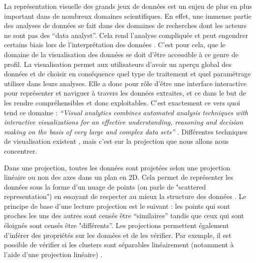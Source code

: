 
La représentation visuelle des grands jeux de données est un enjeu de plus en plus important dans de nombreux domaines scientifiques. En effet, une immense partie des analyses de données se fait dans des domaines de recherches dont les acteurs ne sont pas des “data analyst”. Cela rend l’analyse compliquée et peut engendrer certains biais lors de l’interprétation des données \cite{HeulotAnEvaluation}. C’est pour cela, que le domaine de la visualisation des données se doit d’être accessible à ce genre de profil.\newline
La visualisation permet aux utilisateurs d’avoir un aperçu global des données et de choisir en conséquence quel type de traitement et quel paramétrage utiliser dans leurs analyses. Elle a donc pour rôle d’être une interface interactive pour représenter et naviguer à travers les données extraites, et ce dans le but de les rendre compréhensibles et donc exploitables\cite{card1999readings}. C’est exactement ce vers quoi tend ce domaine : \textit{“Visual analytics combines automated analysis techniques with interactive visualizations for an effective understanding, reasoning and decision making on the basis of very large and complex data sets”} \cite{keim2008visual}. 
Différentes techniques de visualisation existent \cite{HeulotThese}, mais c’est sur la projection que nous allons nous concentrer. 
\smallskip

    Dans une projection, toutes les données sont projetées selon une projection linéaire ou non des axes dans un plan en 2D. Cela permet de représenter les données sous la forme d’un nuage de points (on parle de "scattered representation") en essayant de respecter au mieux la structure des données \cite{HeulotThese}. \newline 
    Le principe de base d'une lecture projection est le suivant : les points qui sont proches les uns des autres sont censés être “similaires” tandis que ceux qui sont éloignés sont censés être "différents''. \newline 
    Les projections permettent également d’inférer des propriétés sur les données et de les vérifier. Par exemple, il est possible de vérifier si les clusters sont séparables linéairement (notamment à l’aide d’une projection linéaire) \cite{HeulotThese} .
\smallskip

